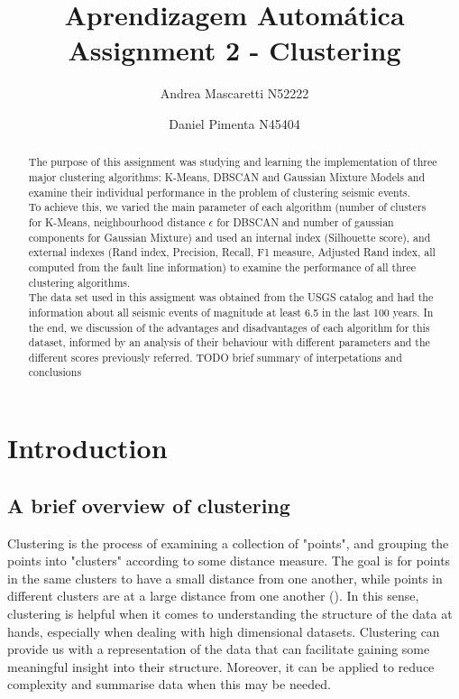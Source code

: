 \documentclass[a4paper]{article}
\title{\textbf{Aprendizagem Autom\'{a}tica} \\
	\large Assignment 2 - Clustering}
\author{Andrea Mascaretti N52222\and Daniel Pimenta N45404}
\begin{document}
	\maketitle
	\begin{abstract}
	The purpose of this assignment was studying and learning the implementation of three major clustering algorithms: K-Means, DBSCAN and Gaussian Mixture Models and
	examine their individual performance in the problem of clustering seismic events.\\
	To achieve this, we varied the main parameter of each algorithm (number of clusters for K-Means, neighbourhood distance $\epsilon$ for DBSCAN and number of gaussian components
	for Gaussian Mixture) and used an internal index (Silhouette score), and external indexes (Rand index, Precision, Recall, F1 measure, Adjusted Rand index, all computed from the fault line information)
	to examine the performance of all three clustering algorithms.\\
	The data set used in this assigment was obtained from the USGS catalog and had the information about all seismic events of magnitude at least 6.5 in the last 100 years.
	In the end, we discussion of the advantages and disadvantages of each algorithm for this dataset, informed by an analysis of their behaviour with different parameters
	and the different scores previously referred.
	TODO brief summary of interpetations and conclusions
	\end{abstract}

	\section{Introduction}
	\subsection{A brief overview of clustering}
	Clustering is the process of examining a collection of "points", and grouping the points into "clusters" according to some distance measure. The goal is for points in the same clusters to have a small distance from one another, while points in different clusters are at a large distance from one another (\cite{9781107077232}).
	In this sense, clustering is helpful when it comes to understanding the structure of the data at hands, especially when dealing with high dimensional datasets. Clustering can provide us with a representation of the data that can facilitate gaining some meaningful insight into their structure. Moreover, it can be applied to reduce complexity and summarise data when this may be needed.\\
\end{document}
